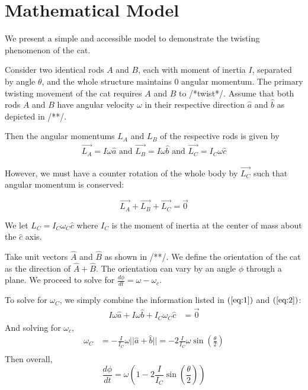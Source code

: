 \documentclass{article}[12pt]
\newcommand{\deriv}[2]{\frac{d#1}{d#2}}
\newcommand{\mymag}[1]{\vert\vert#1\vert\vert}
\begin{document}
    \section{Mathematical Model}

    We present a simple and accessible model to demonstrate the twisting
    phenomenon of the cat.

    Consider two identical rods $A$ and $B$, each with moment of inertia
    $I$, separated by angle $\theta$, and the whole structure maintains $0$
    angular momentum. The primary twisting movement of the
    cat requires $A$ and $B$ to /*twist*/. Assume that both rods $A$ and
    $B$ have angular velocity $\omega$ in their respective direction
    $\hat{a}$ and $\hat{b}$ as depicted in /**/. 

    Then the angular momentums $L_A$ and $L_B$ of the respective rods is
    given by
    \begin{align}
        \overrightarrow{L_A} = I\omega \hat{a} \text{\ \ \ and\ \ \ }
        \overrightarrow{L_B} = I\omega \hat{b} \text{\ \ \ and \ \ \ }
        \overrightarrow{L_C} = I_C\omega \hat{c}
        \label{eq:1}
    \end{align}

    However, we must have a counter rotation of the whole body by
    $\overrightarrow{L_C}$ such that angular
    momentum is conserved:

    \begin{equation}
        \overrightarrow{L_A} + \overrightarrow{L_B} + \overrightarrow{L_C}
        = \overrightarrow{0}
        \label{eq:2}
    \end{equation}

    We let $L_C = I_C \omega_C \hat{c}$ where $I_C$ is the moment of
    inertia at the center of mass about the $\hat{c}$ axis.

    Take unit vectors $\widehat{A}$ and $\widehat{B}$ as shown in /**/. We
    define the orientation of the cat as the direction of
    $\widehat{A}+\widehat{B}$. The orientation can vary by an angle $\phi$
    through a plane. We proceed to solve for $\deriv{\phi}{t} = \omega -
    \omega_c$.
    
    To solve for $\omega_C$, we simply combine the information listed in
    $(\ref{eq:1})$ and $(\ref{eq:2})$:
    \begin{align*}
        I\omega \hat{a} + I\omega \hat{b} + I_C\omega_C \hat{c} &=
        \overrightarrow{0}
    \end{align*}
    And solving for $\omega_c$,
    \begin{align*}
        \omega_C &= -\frac{I}{I_C}\omega \mymag{\hat{a}+\hat{b}} =
        -2\frac{I}{I_C}\omega \sin{\left(\frac{\theta}{2}\right)}\\
    \end{align*}
    Then overall,
    \begin{equation}
        \deriv{\phi}{t} =  
        \omega\left(1-2\frac{I}{I_C}\sin{\left(\frac{\theta}{2}\right)}\right)
    \end{equation}
\end{document}
